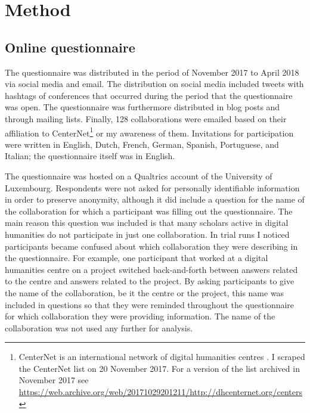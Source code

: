 \documentclass{article}
\begin{document}
\section{Method}
\label{sec:method}

\subsection{Online questionnaire}
The questionnaire was distributed in the period of November 2017 to April 2018 via social media and email. 
The distribution on social media included tweets with hashtags of conferences that occurred during the period that the questionnaire was open. The questionnaire was furthermore distributed in blog posts and through mailing lists. 
Finally, 128 collaborations were emailed based on their affiliation to CenterNet\footnote{CenterNet is an international network of digital humanities centres \citep{walter2012}. I scraped the CenterNet list on 20 November 2017. For a version of the list archived in November 2017 see \url{https://web.archive.org/web/20171029201211/http://dhcenternet.org/centers}} or my awareness of them.
Invitations for participation were written in English, Dutch, French, German, Spanish, Portuguese, and Italian; the questionnaire itself was in English.

The questionnaire was hosted on a Qualtrics account of the University of Luxembourg.
Respondents were not asked for personally identifiable information in order to preserve anonymity,
although it did include a question for the name of the collaboration for which a participant was filling out the questionnaire. The main reason this question was included is that many scholars active in digital humanities do not participate in just one collaboration.
In trial runs I noticed participants became confused about which collaboration they were describing in the questionnaire. For example, one participant that worked at a digital humanities centre on a project switched back-and-forth between answers related to the centre and answers related to the project. 
By asking participants to give the name of the collaboration, be it the centre or the project, this name was included in questions so that they were reminded throughout the questionnaire for which collaboration they were providing information. 
The name of the collaboration was not used any further for analysis.
\end{document}
